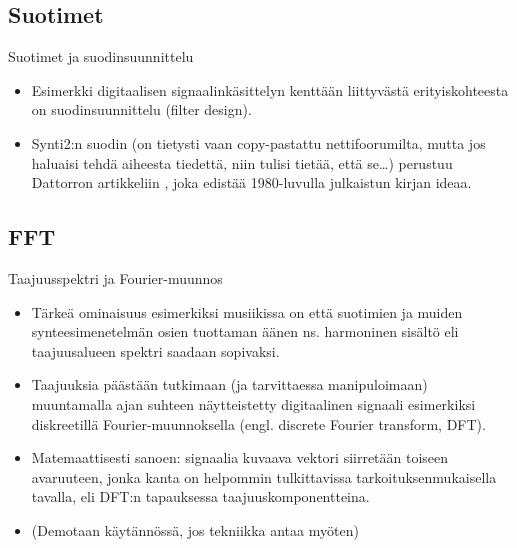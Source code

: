 \documentclass[pdf,10pt,handout]{beamer}
\begin{document}
\subsection{Suotimet}
\begin{frame}{Suotimet ja suodinsuunnittelu}

  \begin{itemize}
    \item
  Esimerkki digitaalisen signaalinkäsittelyn kenttään liittyvästä
  erityiskohteesta on suodinsuunnittelu (filter design).
    \item
  Synti2:n suodin (on tietysti vaan copy-pastattu nettifoorumilta,
  mutta jos haluaisi tehdä aiheesta tiedettä, niin tulisi tietää, että
  se\ldots) perustuu Dattorron artikkeliin \cite{dattorro1997effect},
  joka edistää 1980-luvulla julkaistun kirjan \cite{Chamberlin1980}
  ideaa.
  \end{itemize}

\end{frame}

\subsection{FFT}

\begin{frame}{Taajuusspektri ja Fourier-muunnos}
  \begin{itemize}
\item
  Tärkeä ominaisuus esimerkiksi musiikissa on että suotimien ja muiden
  synteesimenetelmän osien tuottaman äänen ns. harmoninen sisältö eli
  taajuusalueen spektri saadaan sopivaksi.
\item
  Taajuuksia päästään
  tutkimaan (ja tarvittaessa manipuloimaan) muuntamalla ajan suhteen
  näytteistetty digitaalinen signaali esimerkiksi diskreetillä
  Fourier-muunnoksella (engl. discrete Fourier transform,
  DFT).
\item
  Matemaattisesti sanoen: signaalia kuvaava vektori siirretään
  toiseen avaruuteen, jonka kanta on helpommin tulkittavissa
  tarkoituksenmukaisella tavalla, eli DFT:n tapauksessa
  taajuuskomponentteina.
\item[]
  (Demotaan käytännössä, jos tekniikka antaa myöten)
  \end{itemize}
  
\end{frame}
\end{document}
